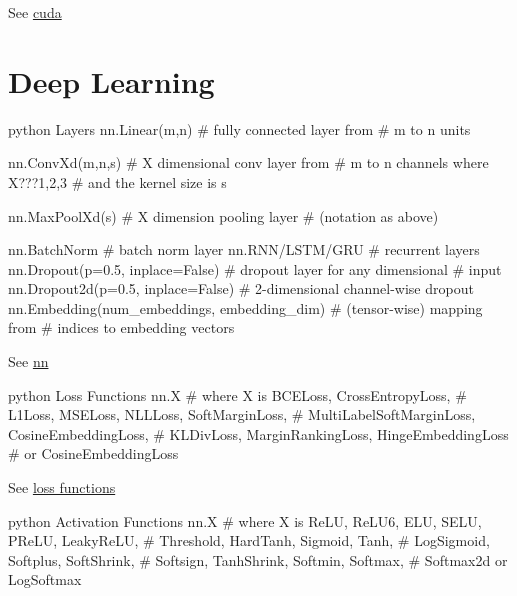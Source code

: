 \documentclass[8pt]{extarticle}
\begin{document}
\begin{multicols}{2}
See \href{https://pytorch.org/docs/stable/cuda.html}{cuda}

\hypertarget{deep-learning}{%
\section{Deep Learning}\label{deep-learning}}

\begin{codebox}{python}{\hypertarget{layers}{%
Layers\label{layers}}}
nn.Linear(m,n)                              # fully connected layer from
                                            # m to n units

nn.ConvXd(m,n,s)                            # X dimensional conv layer from
                                            # m to n channels where X???{1,2,3}
                                            # and the kernel size is s

nn.MaxPoolXd(s)                             # X dimension pooling layer
                                            # (notation as above)

nn.BatchNorm                                # batch norm layer
nn.RNN/LSTM/GRU                             # recurrent layers
nn.Dropout(p=0.5, inplace=False)            # dropout layer for any dimensional 
                                            # input
nn.Dropout2d(p=0.5, inplace=False)          # 2-dimensional channel-wise dropout
nn.Embedding(num_embeddings, embedding_dim) # (tensor-wise) mapping from
                                            # indices to embedding vectors
\end{codebox}

See \href{https://pytorch.org/docs/stable/nn.html}{nn}

\begin{codebox}{python}{\hypertarget{loss-functions}{%
Loss Functions\label{loss-functions}}}
nn.X                        # where X is BCELoss, CrossEntropyLoss,
                            # L1Loss, MSELoss, NLLLoss, SoftMarginLoss,
                            # MultiLabelSoftMarginLoss, CosineEmbeddingLoss,
                            # KLDivLoss, MarginRankingLoss, HingeEmbeddingLoss
                            # or CosineEmbeddingLoss
\end{codebox}

See \href{https://pytorch.org/docs/stable/nn.html\#loss-functions}{loss
functions}

\begin{codebox}{python}{\hypertarget{activation-functions}{%
Activation Functions\label{activation-functions}}}
nn.X                        # where X is ReLU, ReLU6, ELU, SELU, PReLU, LeakyReLU,
                            # Threshold, HardTanh, Sigmoid, Tanh,
                            # LogSigmoid, Softplus, SoftShrink,
                            # Softsign, TanhShrink, Softmin, Softmax,
                            # Softmax2d or LogSoftmax
\end{codebox}


\end{multicols}
\end{document}
